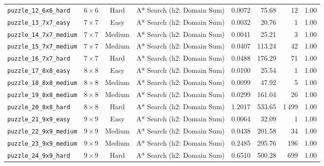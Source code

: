 \documentclass{article}
\begin{document}
\begin{longtable}{@{}lccl r r r c@{}}
  \texttt{puzzle\_12\_6x6\_hard} & $6\times6$ & Hard & A* Search (h2: Domain Sum) & 0.0072 & 75.68 & 12 & 1.00 \\
  \texttt{puzzle\_13\_7x7\_easy} & $7\times7$ & Easy & A* Search (h2: Domain Sum) & 0.0032 & 20.76 & 1 & 1.00 \\
  \texttt{puzzle\_14\_7x7\_medium} & $7\times7$ & Medium & A* Search (h2: Domain Sum) & 0.0041 & 25.21 & 3 & 1.00 \\
  \texttt{puzzle\_15\_7x7\_medium} & $7\times7$ & Medium & A* Search (h2: Domain Sum) & 0.0407 & 113.24 & 42 & 1.00 \\
  \texttt{puzzle\_16\_7x7\_hard} & $7\times7$ & Hard & A* Search (h2: Domain Sum) & 0.0488 & 176.29 & 71 & 1.00 \\
  \texttt{puzzle\_17\_8x8\_easy} & $8\times8$ & Easy & A* Search (h2: Domain Sum) & 0.0100 & 25.54 & 1 & 1.00 \\
  \texttt{puzzle\_18\_8x8\_medium} & $8\times8$ & Medium & A* Search (h2: Domain Sum) & 0.0099 & 47.92 & 5 & 1.00 \\
  \texttt{puzzle\_19\_8x8\_medium} & $8\times8$ & Medium & A* Search (h2: Domain Sum) & 0.0299 & 161.04 & 26 & 1.00 \\
  \texttt{puzzle\_20\_8x8\_hard} & $8\times8$ & Hard & A* Search (h2: Domain Sum) & 1.2017 & 533.65 & 1\,499 & 1.00 \\
  \texttt{puzzle\_21\_9x9\_easy} & $9\times9$ & Easy & A* Search (h2: Domain Sum) & 0.0064 & 32.09 & 1 & 1.00 \\
  \texttt{puzzle\_22\_9x9\_medium} & $9\times9$ & Medium & A* Search (h2: Domain Sum) & 0.0438 & 201.58 & 34 & 1.00 \\
  \texttt{puzzle\_23\_9x9\_medium} & $9\times9$ & Medium & A* Search (h2: Domain Sum) & 0.2485 & 295.76 & 196 & 1.00 \\
  \texttt{puzzle\_24\_9x9\_hard} & $9\times9$ & Hard & A* Search (h2: Domain Sum) & 0.6510 & 500.28 & 699 & 1.00 \\
\end{longtable}
\end{document}
